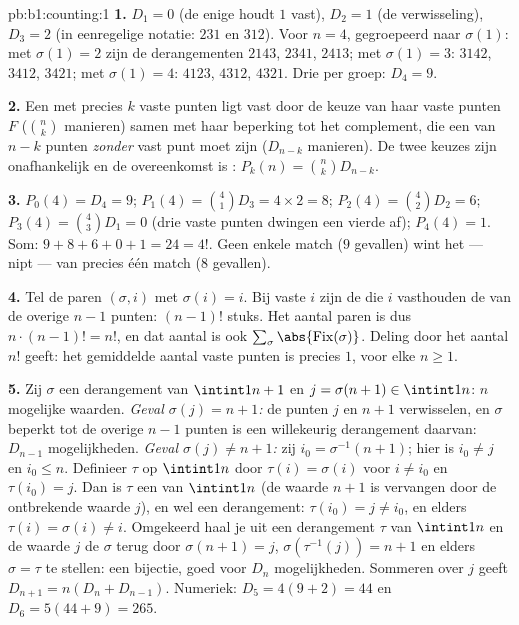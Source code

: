 \begin{solution}{pb:b1:counting:1}
\textbf{1.} $D_1 = 0$ (de enige  houdt $1$ vast), $D_2 = 1$
(de verwisseling), $D_3 = 2$ (in eenregelige notatie: $231$ en $312$).
Voor $n = 4$, gegroepeerd naar $\sigma(1)$: met $\sigma(1) = 2$ zijn de
derangementen $2143$, $2341$, $2413$; met $\sigma(1) = 3$: $3142$,
$3412$, $3421$; met $\sigma(1) = 4$: $4123$, $4312$, $4321$. Drie per
groep: $D_4 = 9$.

\textbf{2.} Een  met precies $k$ vaste punten ligt vast door de
keuze van haar  vaste punten $F$ ($\binom nk$ manieren) samen
met haar beperking tot het complement, die een  van $n - k$
punten \emph{zonder} vast punt moet zijn ($D_{n-k}$ manieren). De twee
keuzes zijn onafhankelijk en de overeenkomst is : $P_k(n) =
\binom nk D_{n-k}$.

\textbf{3.} $P_0(4) = D_4 = 9$; $P_1(4) = \binom41 D_3 = 4 \times 2 =
8$; $P_2(4) = \binom42 D_2 = 6$; $P_3(4) = \binom43 D_1 = 0$ (drie vaste
punten dwingen een vierde af); $P_4(4) = 1$. Som: $9 + 8 + 6 + 0 + 1 =
24 = 4!$. Geen enkele match ($9$ gevallen) wint het --- nipt --- van
precies één match ($8$ gevallen).

\textbf{4.} Tel de paren $(\sigma, i)$ met $\sigma(i) = i$. Bij vaste $i$
zijn de  die $i$ vasthouden de  van de overige
$n - 1$ punten: $(n-1)!$ stuks. Het aantal paren is dus $n \cdot (n-1)! =
n!$, en dat aantal is ook $\sum_\sigma \abs{\mathrm{Fix}(\sigma)}$.
Deling door het aantal $n!$  geeft: het gemiddelde aantal
vaste punten is precies $1$, voor elke $n \geq 1$.

\textbf{5.} Zij $\sigma$ een derangement van $\intint1{n+1}$ en $j =
\sigma(n+1) \in \intint1n$: $n$ mogelijke waarden. \emph{Geval $\sigma(j)
= n+1$:} de punten $j$ en $n+1$ verwisselen, en $\sigma$ beperkt tot de
overige $n - 1$ punten is een willekeurig derangement daarvan:
$D_{n-1}$ mogelijkheden. \emph{Geval $\sigma(j) \neq n+1$:} zij $i_0 =
\sigma^{-1}(n+1)$; hier is $i_0 \neq j$ en $i_0 \leq n$. Definieer $\tau$
op $\intint1n$ door $\tau(i) = \sigma(i)$ voor $i \neq i_0$ en
$\tau(i_0) = j$. Dan is $\tau$ een  van $\intint1n$ (de waarde
$n+1$ is vervangen door de ontbrekende waarde $j$), en wel een
derangement: $\tau(i_0) = j \neq i_0$, en elders $\tau(i) = \sigma(i)
\neq i$. Omgekeerd haal je uit een derangement $\tau$ van $\intint1n$ en
de waarde $j$ de  $\sigma$ terug door $\sigma(n+1) = j$,
$\sigma(\tau^{-1}(j)) = n+1$ en elders $\sigma = \tau$ te stellen: een
bijectie, goed voor $D_n$ mogelijkheden. Sommeren over $j$ geeft
$D_{n+1} = n(D_n + D_{n-1})$. Numeriek: $D_5 = 4(9 + 2) = 44$ en $D_6 =
5(44 + 9) = 265$.


\end{solution}
